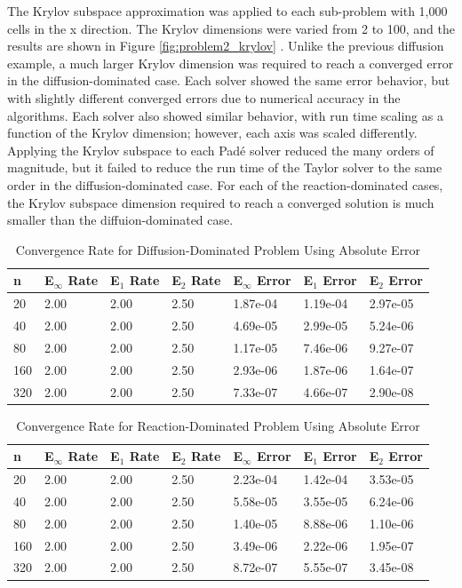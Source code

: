 The Krylov subspace approximation was applied to each sub-problem with 1,000 cells in the x direction. The Krylov dimensions were varied from 2 to 100, and the results are shown in Figure \ref{fig:problem2_krylov} . Unlike the previous diffusion example, a much larger Krylov dimension was required to reach a converged error in the diffusion-dominated case. Each solver showed the same error behavior, but with slightly different converged errors due to numerical accuracy in the algorithms. Each solver also showed similar behavior, with run time scaling as a function of the Krylov dimension; however, each axis was scaled differently. Applying the Krylov subspace to each Pad\'e solver reduced the many orders of magnitude, but it failed to reduce the run time of the Taylor solver to the same order in the diffusion-dominated case. For each of the reaction-dominated cases, the Krylov subspace dimension required to reach a converged solution is much smaller than the diffuion-dominated case. 

\clearpage

\begin{table}[h]
   \caption{\label{tab:diffusion_spatial_convergence_diffusion_dom} Convergence Rate for Diffusion-Dominated Problem Using Absolute Error}
   \centering
   \begin{tabular}{lllllll}
   \hline
    n & E${}_{\infty}$ Rate & E${}_{1}$ Rate & E${}_{2}$ Rate & E${}_{\infty}$ Error & E${}_{1}$ Error & E${}_{2}$ Error\\
   \hline
    20 & 2.00 & 2.00 & 2.50 & 1.87e-04 & 1.19e-04 & 2.97e-05 \\ 
    40 & 2.00 & 2.00 & 2.50 & 4.69e-05 & 2.99e-05 & 5.24e-06 \\ 
    80 & 2.00 & 2.00 & 2.50 & 1.17e-05 & 7.46e-06 & 9.27e-07 \\ 
   160 & 2.00 & 2.00 & 2.50 & 2.93e-06 & 1.87e-06 & 1.64e-07 \\ 
   320 & 2.00 & 2.00 & 2.50 & 7.33e-07 & 4.66e-07 & 2.90e-08 \\ 
   \hline
   \end{tabular}
\end{table}

\begin{table}[h]
   \caption{\label{tab:diffusion_spatial_convergence_reaction_dom} Convergence Rate for Reaction-Dominated Problem Using Absolute Error}
   \centering
   \begin{tabular}{lllllll}
   \hline
    n & E${}_{\infty}$ Rate & E${}_{1}$ Rate & E${}_{2}$ Rate & E${}_{\infty}$ Error & E${}_{1}$ Error & E${}_{2}$ Error\\
   \hline
    20 & 2.00 & 2.00 & 2.50 & 2.23e-04 & 1.42e-04 & 3.53e-05 \\  
    40 & 2.00 & 2.00 & 2.50 & 5.58e-05 & 3.55e-05 & 6.24e-06 \\  
    80 & 2.00 & 2.00 & 2.50 & 1.40e-05 & 8.88e-06 & 1.10e-06 \\  
   160 & 2.00 & 2.00 & 2.50 & 3.49e-06 & 2.22e-06 & 1.95e-07 \\  
   320 & 2.00 & 2.00 & 2.50 & 8.72e-07 & 5.55e-07 & 3.45e-08 \\  
   \hline
   \end{tabular}
\end{table}

